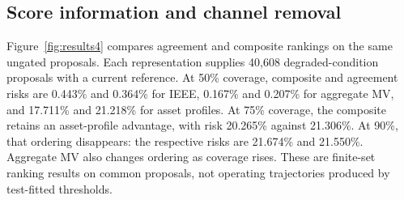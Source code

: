\documentclass[preprint,12pt]{elsarticle}
\begin{document}
\subsection{Score information and channel removal}
Figure~\ref{fig:results4} compares agreement and composite rankings on the same ungated proposals. Each representation supplies 40,608 degraded-condition proposals with a current reference. At 50\% coverage, composite and agreement risks are 0.443\% and 0.364\% for IEEE, 0.167\% and 0.207\% for aggregate MV, and 17.711\% and 21.218\% for asset profiles. At 75\% coverage, the composite retains an asset-profile advantage, with risk 20.265\% against 21.306\%. At 90\%, that ordering disappears: the respective risks are 21.674\% and 21.550\%. Aggregate MV also changes ordering as coverage rises. These are finite-set ranking results on common proposals, not operating trajectories produced by test-fitted thresholds.
\end{document}
